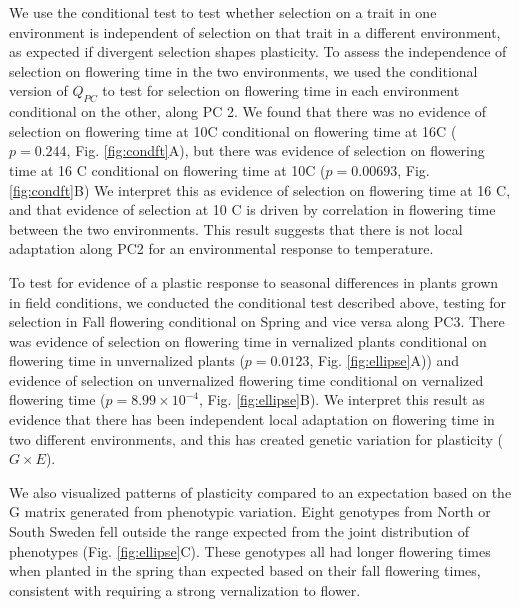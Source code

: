 \documentclass[11pt,letterpaper]{article}
\begin{document}

We use the conditional test to test whether selection on a trait in one environment is independent of selection on that trait in a different environment, as expected if divergent selection shapes plasticity.
To assess the independence of selection on flowering time in the two environments, we used the conditional version of $Q_{PC}$ to test for selection on flowering time in each environment conditional on the other, along PC 2.
We found that there was no evidence of selection on flowering time at 10\degree C conditional on flowering time at 16\degree C ($p = 0.244$, Fig. \ref{fig:condft}A), but there was evidence of selection on flowering time at 16 \degree C conditional on flowering time at 10\degree C ($p = 0.00693$, Fig. \ref{fig:condft}B) 
We interpret this as evidence of selection on flowering time at 16 \degree C, and that evidence of selection at 10 \degree C is driven by correlation in flowering time between the two environments.
This result suggests that there is not local adaptation along PC2 for an environmental response to temperature.


To test for evidence of a plastic response to seasonal differences in plants grown in field  conditions, we conducted the conditional test described above, testing for selection in Fall flowering conditional on Spring and vice versa along PC3.
There was evidence of selection on flowering time in vernalized plants conditional on flowering time in unvernalized plants ($p = 0.0123$, Fig. \ref{fig:ellipse}A)) and evidence of selection on unvernalized flowering time conditional on vernalized flowering time ($p = 8.99 \times 10^{-4}$, Fig. \ref{fig:ellipse}B).
We interpret this result as evidence that there has been independent local adaptation on flowering time in two different environments, and this has created genetic variation for plasticity ($G \times E$).

We also visualized patterns of plasticity compared to an expectation based on the G matrix generated from phenotypic variation. 
Eight genotypes from North or South Sweden fell outside the range expected from the joint distribution of phenotypes (Fig. \ref{fig:ellipse}C).
These genotypes all had longer flowering times when planted in the spring than expected based on their fall flowering times, consistent with requiring a strong vernalization to flower.
\end{document}
